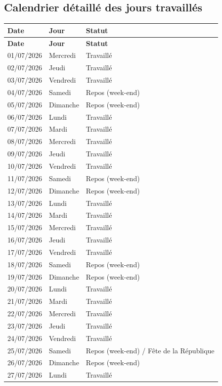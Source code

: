 \documentclass[11pt,a4paper]{article}
\begin{document}
\subsection*{Calendrier détaillé des jours travaillés}
{\small
\begin{longtable}{l l l}
\toprule
\textbf{Date} & \textbf{Jour} & \textbf{Statut} \\
\midrule
\endfirsthead
\toprule
\textbf{Date} & \textbf{Jour} & \textbf{Statut} \\
\midrule
\endhead
01/07/2026 & Mercredi & Travaillé \\
02/07/2026 & Jeudi & Travaillé \\
03/07/2026 & Vendredi & Travaillé \\
04/07/2026 & Samedi & Repos (week-end) \\
05/07/2026 & Dimanche & Repos (week-end) \\
06/07/2026 & Lundi & Travaillé \\
07/07/2026 & Mardi & Travaillé \\
08/07/2026 & Mercredi & Travaillé \\
09/07/2026 & Jeudi & Travaillé \\
10/07/2026 & Vendredi & Travaillé \\
11/07/2026 & Samedi & Repos (week-end) \\
12/07/2026 & Dimanche & Repos (week-end) \\
13/07/2026 & Lundi & Travaillé \\
14/07/2026 & Mardi & Travaillé \\
15/07/2026 & Mercredi & Travaillé \\
16/07/2026 & Jeudi & Travaillé \\
17/07/2026 & Vendredi & Travaillé \\
18/07/2026 & Samedi & Repos (week-end) \\
19/07/2026 & Dimanche & Repos (week-end) \\
20/07/2026 & Lundi & Travaillé \\
21/07/2026 & Mardi & Travaillé \\
22/07/2026 & Mercredi & Travaillé \\
23/07/2026 & Jeudi & Travaillé \\
24/07/2026 & Vendredi & Travaillé \\
25/07/2026 & Samedi & Repos (week-end) / Fête de la République \\
26/07/2026 & Dimanche & Repos (week-end) \\
27/07/2026 & Lundi & Travaillé \\

\end{longtable}}
\end{document}
